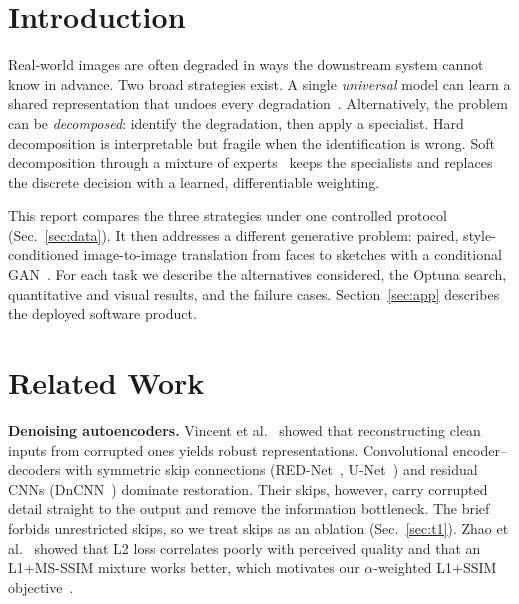 ﻿\documentclass[conference]{IEEEtran}
\begin{document}
\section{Introduction}
Real-world images are often degraded in ways the downstream system cannot know in advance. Two
broad strategies exist. A single \emph{universal} model can learn a shared representation that undoes
every degradation~\cite{li2022airnet,potlapalli2023promptir}. Alternatively, the problem can be
\emph{decomposed}: identify the degradation, then apply a specialist. Hard decomposition is
interpretable but fragile when the identification is wrong. Soft decomposition through a mixture of
experts~\cite{jacobs1991moe,shazeer2017moe} keeps the specialists and replaces the discrete decision
with a learned, differentiable weighting.

This report compares the three strategies under one controlled protocol (Sec.~\ref{sec:data}). It
then addresses a different generative problem: paired, style-conditioned image-to-image translation
from faces to sketches with a conditional GAN~\cite{mirza2014cgan,isola2017pix2pix}. For each task we
describe the alternatives considered, the Optuna search, quantitative and visual results, and the
failure cases. Section~\ref{sec:app} describes the deployed software product.

\section{Related Work}
\textbf{Denoising autoencoders.} Vincent et al.~\cite{vincent2008dae} showed that reconstructing clean
inputs from corrupted ones yields robust representations. Convolutional encoder--decoders with
symmetric skip connections (RED-Net~\cite{mao2016rednet}, U-Net~\cite{ronneberger2015unet}) and
residual CNNs (DnCNN~\cite{zhang2017dncnn}) dominate restoration. Their skips, however, carry
corrupted detail straight to the output and remove the information bottleneck. The brief forbids
unrestricted skips, so we treat skips as an ablation (Sec.~\ref{sec:t1}). Zhao et al.~\cite{zhao2017loss}
showed that L2 loss correlates poorly with perceived quality and that an L1+MS-SSIM mixture works
better, which motivates our $\alpha$-weighted L1+SSIM objective~\cite{wang2004ssim}.
\end{document}
